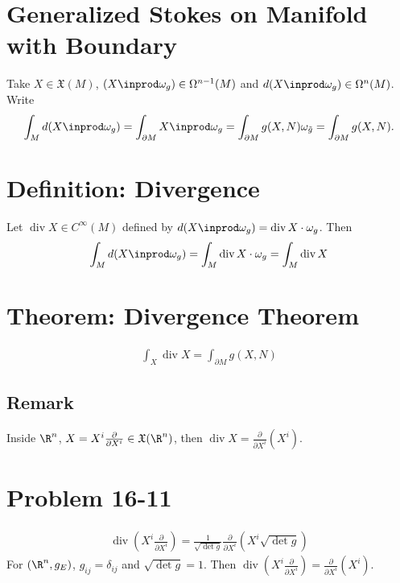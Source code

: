 \documentclass[11pt]{article}
\begin{document}
\section*{Generalized Stokes on Manifold with Boundary}
\label{sec:orge9e2827}
Take \(X\in\mathfrak{X}(M)\), \((X\inprod\omega_{g})\in\Omega^{n-1}(M)\) and \(d(X\inprod\omega_{g})\in\Omega^{n}(M)\). Write\\
\begin{align*}
  \int_{M}d(X\inprod\omega_{g})
  =\int_{\partial M}X\inprod\omega_{g}
  =\int_{\partial M}g(X,N)\omega_{\tilde{g}}
  =\int_{\partial M}g(X,N).
\end{align*}
\section*{Definition: Divergence}
\label{sec:orgd168309}
Let \(\operatorname{div}X\in C^{\infty}(M)\) defined by \(d(X\inprod\omega_{g})=\operatorname{div}X\cdot\omega_{g}\). Then\\
\begin{align*}
  \int_{M}d(X\inprod \omega_{g})
  =\int_{M}\operatorname{div}X\cdot\omega_{g}
  =\int_{M}\operatorname{div}X
\end{align*}
\section*{Theorem: Divergence Theorem}
\label{sec:org6ad625e}
\begin{align*}
  \int_{X}\operatorname{div}X
  =\int_{\partial M}g(X,N)
\end{align*}
\subsection*{Remark}
\label{sec:org074830d}
Inside \(\R^{n}\), \(X=X^{i}\frac{\partial}{\partial X^{i}}\in\mathfrak{X}(\R^{n})\), then \(\operatorname{div}X=\frac{\partial}{\partial X^{i}}(X^{i})\).\\
\section*{Problem 16-11}
\label{sec:org3012bb5}
\begin{align*}
  \operatorname{div}\left( X^{i}\frac{\partial}{\partial X^{i}} \right)
  =\frac{1}{\sqrt{\det g}}\frac{\partial}{\partial X^{i}}\left( X^{i}\sqrt{\det g} \right)
\end{align*}
For \((\R^{n},g_{E})\), \(g_{ij}=\delta_{ij}\) and \(\sqrt{\det g}=1\). Then \(\operatorname{div}\left( X^{i}\frac{\partial}{\partial X^{i}} \right)=\frac{\partial}{\partial X^{i}}(X^{i})\).\\
\end{document}
